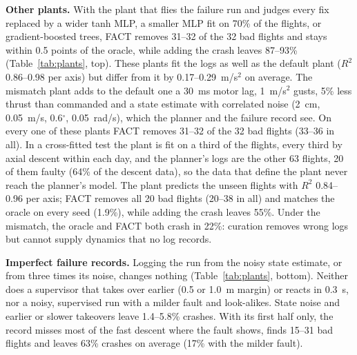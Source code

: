 \documentclass[preprint,12pt]{elsarticle}
\newcommand{\method}{FACT}
\begin{document}
\textbf{Other plants.} With the plant that flies the failure run and judges every fix replaced by a wider tanh MLP, a smaller MLP fit on 70\% of the flights, or gradient-boosted trees, \method{} removes 31--32 of the 32 bad flights and stays within 0.5 points of the oracle, while adding the crash leaves 87--93\% (Table~\ref{tab:plants}, top). These plants fit the logs as well as the default plant ($R^2$ 0.86--0.98 per axis) but differ from it by 0.17--0.29~m/s$^2$ on average. The mismatch plant adds to the default one a 30~ms motor lag, 1~m/s$^2$ gusts, 5\% less thrust than commanded and a state estimate with correlated noise (2~cm, 0.05~m/s, 0.6$^\circ$, 0.05~rad/s), which the planner and the failure record see. On every one of these plants \method{} removes 31--32 of the 32 bad flights (33--36 in all). In a cross-fitted test the plant is fit on a third of the flights, every third by axial descent within each day, and the planner's logs are the other 63 flights, 20 of them faulty (64\% of the descent data), so the data that define the plant never reach the planner's model. The plant predicts the unseen flights with $R^2$ 0.84--0.96 per axis; \method{} removes all 20 bad flights (20--38 in all) and matches the oracle on every seed (1.9\%), while adding the crash leaves 55\%. Under the mismatch, the oracle and \method{} both crash in 22\%: curation removes wrong logs but cannot supply dynamics that no log records.

\textbf{Imperfect failure records.} Logging the run from the noisy state estimate, or from three times its noise, changes nothing (Table~\ref{tab:plants}, bottom). Neither does a supervisor that takes over earlier (0.5 or 1.0~m margin) or reacts in 0.3~s, nor a noisy, supervised run with a milder fault and look-alikes. State noise and earlier or slower takeovers leave 1.4--5.8\% crashes. With its first half only, the record misses most of the fast descent where the fault shows, finds 15--31 bad flights and leaves 63\% crashes on average (17\% with the milder fault).
\end{document}
